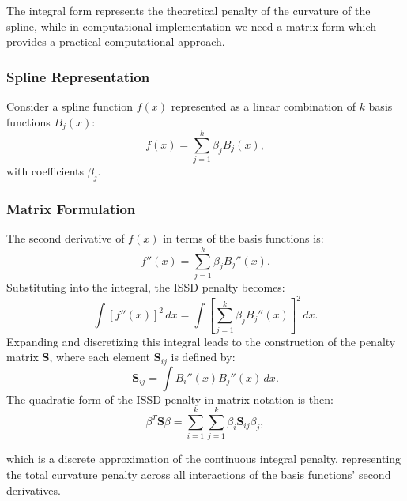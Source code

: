 \documentclass[12pt, twoside,hidelinks]{article}
\theoremstyle{definition}
\numberwithin{equation}{section}
\begin{document}
The integral form represents the theoretical penalty of the curvature of the spline, while in computational implementation we need a matrix form which provides a practical computational approach.

\subsubsection*{Spline Representation}
Consider a spline function \( f(x) \) represented as a linear combination of \( k \) basis functions \( B_j(x) \):
\begin{equation}
    f(x) = \sum_{j=1}^{k} \beta_j B_j(x),
\end{equation}
with coefficients \( \beta_j \).

\subsubsection*{Matrix Formulation}
The second derivative of \( f(x) \) in terms of the basis functions is:
\begin{equation}
    f''(x) = \sum_{j=1}^{k} \beta_j B_j''(x).
\end{equation}
Substituting into the integral, the ISSD penalty becomes:
\begin{equation}
    \int [f''(x)]^2 \, dx = \int \left[ \sum_{j=1}^{k} \beta_j B_j''(x) \right]^2 \, dx.
\end{equation}
Expanding and discretizing this integral leads to the construction of the penalty matrix \( \mathbf{S} \), where each element \( \mathbf{S}_{ij} \) is defined by:
\begin{equation}
    \mathbf{S}_{ij} = \int B_i''(x) B_j''(x) \, dx.
\end{equation}
The quadratic form of the ISSD penalty in matrix notation is then:
\begin{equation}
    \beta^T \mathbf{S} \beta = \sum_{i=1}^{k} \sum_{j=1}^{k} \beta_i \mathbf{S}_{ij} \beta_j,
\end{equation}

which is a discrete approximation of the continuous integral penalty, representing the total curvature penalty across all interactions of the basis functions' second derivatives.
\end{document}
